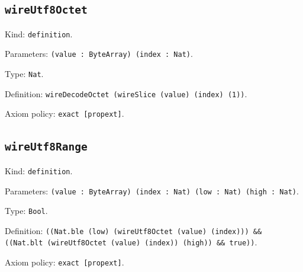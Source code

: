 \documentclass[11pt]{article}
\begin{document}
\subsection*{\texttt{wireUtf8Octet}}
\noindent Kind: \texttt{definition}.\par
\noindent Parameters: \texttt{(value : ByteArray) (index : Nat)}.\par
\noindent Type: \texttt{Nat}.\par
\noindent Definition: \texttt{wireDecodeOctet (wireSlice (value) (index) (1))}.\par
\noindent Axiom policy: \texttt{exact [propext]}.\par
\subsection*{\texttt{wireUtf8Range}}
\noindent Kind: \texttt{definition}.\par
\noindent Parameters: \texttt{(value : ByteArray) (index : Nat) (low : Nat) (high : Nat)}.\par
\noindent Type: \texttt{Bool}.\par
\noindent Definition: \texttt{((Nat.ble (low) (wireUtf8Octet (value) (index))) \&\& ((Nat.blt (wireUtf8Octet (value) (index)) (high)) \&\& true))}.\par
\noindent Axiom policy: \texttt{exact [propext]}.\par
\end{document}
